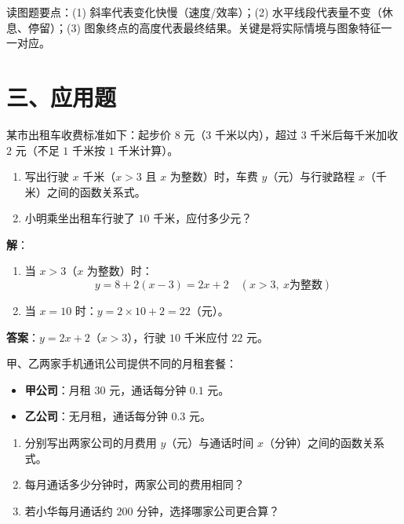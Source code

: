 \documentclass[12pt, a4paper]{ctexart}
\begin{document}
\begin{tipbox}[方法总结]
读图题要点：(1) 斜率代表变化快慢（速度/效率）；(2) 水平线段代表量不变（休息、停留）；(3) 图象终点的高度代表最终结果。关键是将实际情境与图象特征一一对应。
\end{tipbox}

\section*{\textcolor{apppurple}{三、应用题}}

\begin{appbox}[【应用1】出租车计费问题]
某市出租车收费标准如下：起步价 $8$ 元（$3$ 千米以内），超过 $3$ 千米后每千米加收 $2$ 元（不足 $1$ 千米按 $1$ 千米计算）。

\begin{enumerate}[leftmargin=2em]
  \item 写出行驶 $x$ 千米（$x>3$ 且 $x$ 为整数）时，车费 $y$（元）与行驶路程 $x$（千米）之间的函数关系式。
  \item 小明乘坐出租车行驶了 $10$ 千米，应付多少元？
\end{enumerate}
\end{appbox}

\textbf{解}：

\begin{enumerate}[leftmargin=2em]
  \item 当 $x > 3$（$x$ 为整数）时：
  $$y = 8 + 2(x - 3) = 2x + 2 \quad (x > 3,\ x \text{为整数})$$

  \item 当 $x = 10$ 时：$y = 2 \times 10 + 2 = 22$（元）。
\end{enumerate}

\textbf{答案}：$y = 2x + 2$（$x>3$），行驶 $10$ 千米应付 $22$ 元。

\begin{appbox}[【应用2】手机套餐选择问题]
甲、乙两家手机通讯公司提供不同的月租套餐：

\begin{itemize}[leftmargin=2em]
  \item \textbf{甲公司}：月租 $30$ 元，通话每分钟 $0.1$ 元。
  \item \textbf{乙公司}：无月租，通话每分钟 $0.3$ 元。
\end{itemize}

\begin{enumerate}[leftmargin=2em]
  \item 分别写出两家公司的月费用 $y$（元）与通话时间 $x$（分钟）之间的函数关系式。
  \item 每月通话多少分钟时，两家公司的费用相同？
  \item 若小华每月通话约 $200$ 分钟，选择哪家公司更合算？
\end{enumerate}
\end{appbox}
\end{document}
